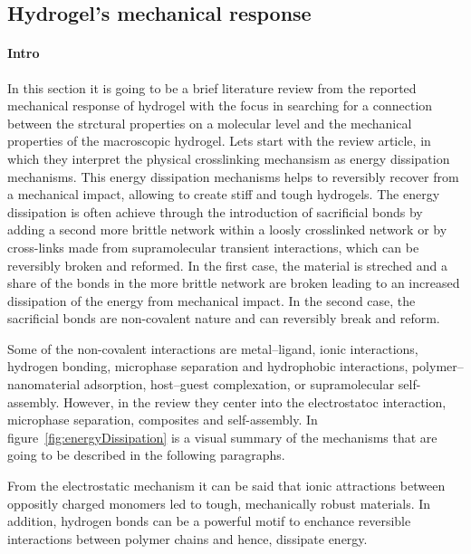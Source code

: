 \subsection{Hydrogel's mechanical response}


\paragraph{Intro}
In this section it is going to be a brief literature review from the reported mechanical response of hydrogel with the focus in searching for a connection between the strctural properties on a molecular level and the mechanical properties of the macroscopic hydrogel.
Lets start with the review article\citep{petelinsekToughHydrogelsLoadBearing2024}, in which they interpret the physical crosslinking mechansism as energy dissipation mechanisms.
This energy dissipation mechanisms helps to reversibly recover from a mechanical impact, allowing to create stiff and tough hydrogels.
The energy dissipation is often achieve through the introduction of sacrificial bonds by adding a second more brittle network within a loosly crosslinked network or by cross-links made from supramolecular transient interactions, which can be reversibly broken and reformed.
In the first case, the material is streched and a share of the bonds in the more brittle network are broken leading to an increased dissipation of the energy from mechanical impact.
In the second case, the sacrificial bonds are non-covalent nature and can reversibly break and reform.

Some of the non-covalent interactions are 
    metal–ligand, 
    ionic interactions, 
    hydrogen bonding, 
    microphase separation 
    and hydrophobic interactions, 
    polymer–nanomaterial adsorption, 
    host–guest complexation, 
    or supramolecular self-assembly.
However, in the review they center into the electrostatoc interaction, microphase separation, composites and self-assembly.
In figure~\ref{fig:energyDissipation} is a visual summary of the mechanisms that are going to be described in the following paragraphs.

From the electrostatic mechanism it can be said that ionic attractions between oppositly charged monomers led to tough, mechanically robust materials.
In addition, hydrogen bonds can be a powerful motif to enchance reversible interactions between polymer chains and hence, dissipate energy.

